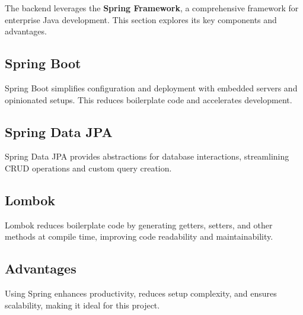 \Author{\daAuthorThree}

    The backend leverages the \textbf{Spring Framework}, a comprehensive framework for enterprise Java development. This section explores its key components and advantages.

    \subsection{Spring Boot}
    Spring Boot simplifies configuration and deployment with embedded servers and opinionated setups. This reduces boilerplate code and accelerates development.

    \subsection{Spring Data JPA}
    Spring Data JPA provides abstractions for database interactions, streamlining CRUD operations and custom query creation.

    \subsection{Lombok}
    Lombok reduces boilerplate code by generating getters, setters, and other methods at compile time, improving code readability and maintainability.

    \subsection{Advantages}
    Using Spring enhances productivity, reduces setup complexity, and ensures scalability, making it ideal for this project.

